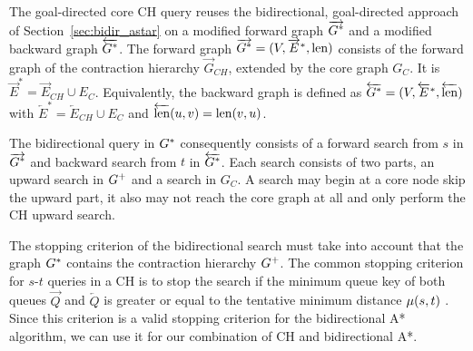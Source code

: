 The goal-directed core CH query reuses the bidirectional, goal-directed approach of Section~\ref{sec:bidir_astar} on a modified forward graph $\overrightarrow{G^*}$ and a modified backward graph $\overleftarrow{G^*}$. The forward graph $\overrightarrow{G^*} = (V,\overrightarrow{E}^*,\operatorname{len})$ consists of the forward graph of the contraction hierarchy $\overrightarrow{G}_{CH}$, extended by the core graph $G_C$. It is $\overrightarrow{E}^* = \overrightarrow{E}_{CH} \cup E_C $. Equivalently, the backward graph is defined as $\overleftarrow{G^*} = (V,\overleftarrow{E}^*,\overleftarrow{\operatorname{len}})$ with $\overleftarrow{E}^* = \overleftarrow{E}_{CH} \cup E_C$ and $\overleftarrow{\operatorname{len}}(u,v) = \operatorname{len}(v,u)$.

The bidirectional query in $G^*$ consequently consists of a forward search from $s$ in $\overrightarrow{G^*}$ and backward search from $t$ in $\overleftarrow{G^*}$. Each search consists of two parts, an upward search in $G^+$ and a search in $G_C$. A search may begin at a core node skip the upward part, it also may not reach the core graph at all and only perform the CH upward search.

The stopping criterion of the bidirectional search must take into account that the graph $G^*$ contains the contraction hierarchy $G^+$. The common stopping criterion for $s$-$t$ queries in a CH is to stop the search if the minimum queue key of both queues $\overrightarrow{Q}$ and $\overleftarrow{Q}$ is greater or equal to the tentative minimum distance $\mu(s,t)$ \cite{geisberger:2012}. Since this criterion is a valid stopping criterion for the bidirectional A* algorithm, we can use it for our combination of CH and bidirectional A*.

